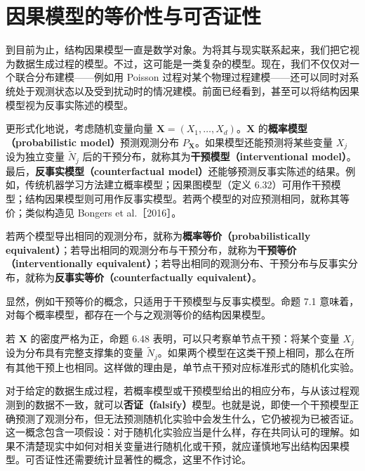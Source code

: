 \section{因果模型的等价性与可否证性}
\label{sec:ch06-equivalence}

到目前为止，结构因果模型一直是数学对象。为将其与现实联系起来，我们把它视为数据生成过程的模型。不过，这可能是一类复杂的模型。现在，我们不仅仅对一个联合分布建模——例如用 Poisson 过程对某个物理过程建模——还可以同时对系统处于观测状态以及受到扰动时的情况建模。前面已经看到，甚至可以将结构因果模型视为反事实陈述的模型。

更形式化地说，考虑随机变量向量 $\mathbf X=(X_1,\ldots,X_d)$。$\mathbf X$ 的\textbf{概率模型（probabilistic model）}预测观测分布 $P_{\mathbf X}$。如果模型还能预测将某些变量 $X_j$ 设为独立变量 $\widetilde N_j$ 后的干预分布，就称其为\textbf{干预模型（interventional model）}。最后，\textbf{反事实模型（counterfactual model）}还能够预测反事实陈述的结果。例如，传统机器学习方法建立概率模型；因果图模型（定义 6.32）可用作干预模型；结构因果模型则可用作反事实模型。若两个模型的对应预测相同，就称其等价；类似构造见 Bongers et al.［2016］。

\Needspace{4cm}
\begin{definition}[因果模型的等价性]
若两个模型导出相同的观测分布，就称为\textbf{概率等价（probabilistically equivalent）}；若导出相同的观测分布与干预分布，就称为\textbf{干预等价（interventionally equivalent）}；若导出相同的观测分布、干预分布与反事实分布，就称为\textbf{反事实等价（counterfactually equivalent）}。
\end{definition}

显然，例如干预等价的概念，只适用于干预模型与反事实模型。命题 7.1 意味着，对每个概率模型，都存在一个与之观测等价的结构因果模型。

若 $\mathbf X$ 的密度严格为正，命题 6.48 表明，可以只考察单节点干预：将某个变量 $X_j$ 设为分布具有完整支撑集的变量 $\widetilde N_j$。如果两个模型在这类干预上相同，那么在所有其他干预上也相同。这样做的理由是，单节点干预对应标准形式的随机化实验。

对于给定的数据生成过程，若概率模型或干预模型给出的相应分布，与从该过程观测到的数据不一致，就可以\textbf{否证（falsify）}模型。也就是说，即使一个干预模型正确预测了观测分布，但无法预测随机化实验中会发生什么，它仍被视为已被否证。这一概念包含一项假设：对于随机化实验应当是什么样，存在共同认可的理解。如果不清楚现实中如何对相关变量进行随机化或干预，就应谨慎地写出结构因果模型。可否证性还需要统计显著性的概念，这里不作讨论。

